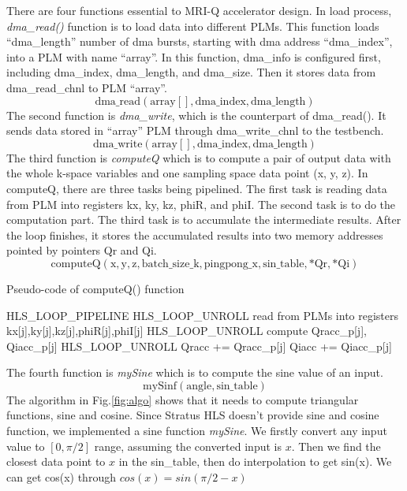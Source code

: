 There are four functions essential to MRI-Q accelerator design. In load process,
\textit{dma\_read()} function is to load data into different PLMs. This
function loads ``dma\_length'' number of dma bursts, starting with dma 
address ``dma\_index'',
into a PLM with name ``array''. In this function, dma\_info is configured first,
including dma\_index, dma\_length, and dma\_size. Then it stores data from
dma\_read\_chnl to PLM ``array''.
%
$$\mathrm{dma\_read(array[], dma\_index, dma\_length)}$$
%
The second function is \textit{dma\_write}, which is the counterpart of
dma\_read(). It sends data stored in ``array'' PLM through dma\_write\_chnl to
the testbench.
%
$$\mathrm{dma\_write(array[], dma\_index, dma\_length)}$$
%
The third function is \textit{computeQ} which is to compute a pair of output
data with the whole k-space variables and one sampling space data point (x, y,
z). In computeQ, there are three tasks being pipelined. The first task is
reading data from PLM into registers kx, ky, kz, phiR, and phiI. The second task
is to do the computation part. The third task is to accumulate the intermediate
results. After the loop finishes, it stores the accumulated results into two
memory addresses pointed by pointers Qr and Qi.
%
$$\mathrm{computeQ(x, y, z, batch\_size\_k, pingpong\_x, sin\_table, *Qr, *Qi)}$$


\begin{algorithm}
\caption{Pseudo-code of computeQ() function}
\label{fig-data-convert}
\begin{algorithmic} 
\STATE HLS\_LOOP\_PIPELINE
\STATE HLS\_LOOP\_UNROLL
\STATE read from PLMs into registers 
\STATE \quad kx[j],ky[j],kz[j],phiR[j],phiI[j]
\ENDFOR
{}
\STATE HLS\_LOOP\_UNROLL
\STATE compute Qracc\_p[j], Qiacc\_p[j]
\ENDFOR
{}
\STATE HLS\_LOOP\_UNROLL
\STATE Qracc += Qracc\_p[j]
\STATE Qiacc += Qiacc\_p[j]
\ENDFOR
\ENDFOR
\end{algorithmic}
\end{algorithm}


The fourth function is \textit{mySine} which is to compute the sine value of an
input.
%
$$\mathrm{mySinf(angle, sin\_table)}$$
%
The algorithm in Fig.\ref{fig:algo} shows
that it needs to compute triangular functions, sine and cosine. Since Stratus
HLS doesn't provide sine and cosine function, we implemented a sine function
\textit{mySine}. We firstly convert any input value to $[0,  \pi/2]$ range, assuming the converted input is $x$.
Then we find the closest data point to $x$ in the sin\_table, then do interpolation
to get sin(x). We can get cos(x) through $cos(x) = sin(\pi/2 - x)$ \\

